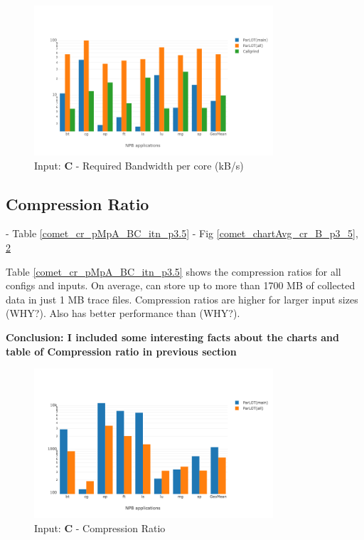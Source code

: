 \begin{figure}[!t]
\centering
\includegraphics[width=3.5in]{figs.comet/comet_chartAvg_bw_C_p3_5.png}
\caption{ Input: \textbf{C}  - Required Bandwidth per core (kB/s)
}
\label{comet_chartAvg_bw_C_p3_5}
\end{figure}


  
\subsection{Compression Ratio}
\label{subsec:cr}
 - Table \ref{comet_cr_pMpA_BC_itn_p3.5}
  - Fig \ref{comet_chartAvg_cr_B_p3_5}, \ref{comet_chartAvg_cr_C_p3_5}

  Table \ref{comet_cr_pMpA_BC_itn_p3.5} shows the compression ratios for all configs and inputs. On average, \parlot can store up to more than 1700 MB of collected data in just 1 MB trace files. Compression ratios are higher for larger input sizes (WHY?). Also \parlotm has better performance than \parlota (WHY?).
  
\textbf{Conclusion: I included some interesting facts about the charts and table of Compression ratio in previous section}



\begin{figure}[!t]
\centering
\includegraphics[width=3.5in]{figs.comet/comet_chartAvg_cr_C_p3_5.png}
\caption{ Input: \textbf{C}  - Compression Ratio
}
\label{comet_chartAvg_cr_C_p3_5}
\end{figure}


